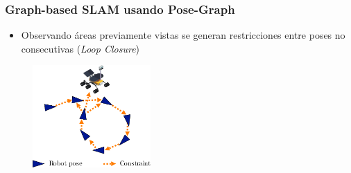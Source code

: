 \begin{frame}
    \frametitle{Graph-based SLAM usando Pose-Graph}
    
    \begin{itemize}
    	\item Observando áreas previamente vistas se generan restricciones entre poses no consecutivas (\emph{Loop Closure})
    \end{itemize}
    
   	\begin{figure}[!h]
    	\includegraphics[width=0.4\textwidth]{images/pose_graph_loop_example.pdf}
    \end{figure}
    
\end{frame}

